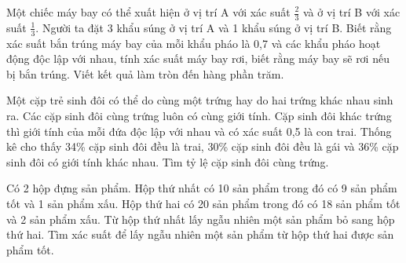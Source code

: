 \begin{ex}%
    Một chiếc máy bay có thể xuất hiện ở vị trí A với xác suất $\frac{2}{3}$ và ở vị trí B với xác suất $\frac{1}{3}$. Người ta đặt 3 khẩu súng ở vị trí A và 1 khẩu súng ở vị trí B. Biết rằng xác suất bắn trúng máy bay của mỗi khẩu pháo là 0,7 và các khẩu pháo hoạt động độc lập với nhau, tính xác suất máy bay rơi, biết rằng máy bay sẽ rơi nếu bị bắn trúng. Viết kết quả làm tròn đến hàng phần trăm.
\end{ex}
\begin{ex}%
    Một cặp trẻ sinh đôi có thể do cùng một trứng hay do hai trứng khác nhau sinh ra. Các cặp sinh đôi cùng trứng luôn có cùng giới tính. Cặp sinh đôi khác trứng thì giới tính của mỗi đứa độc lập với nhau và có xác suất 0,5 là con trai. Thống kê cho thấy 34\% cặp sinh đôi đều là trai, 30\% cặp sinh đôi đều là gái và 36\% cặp sinh đôi có giới tính khác nhau. Tìm tỷ lệ cặp sinh đôi cùng trứng.
\end{ex}
\begin{ex}%
    Có 2 hộp đựng sản phẩm. Hộp thứ nhất có 10 sản phẩm trong đó có 9 sản phẩm tốt và 1 sản phẩm xấu. Hộp thứ hai có 20 sản phẩm trong đó có 18 sản phẩm tốt và 2 sản phẩm xấu. Từ hộp thứ nhất lấy ngẫu nhiên một sản phẩm bỏ sang hộp thứ hai. Tìm xác suất để lấy ngẫu nhiên một sản phẩm từ hộp thứ hai được sản phẩm tốt.
\end{ex}
